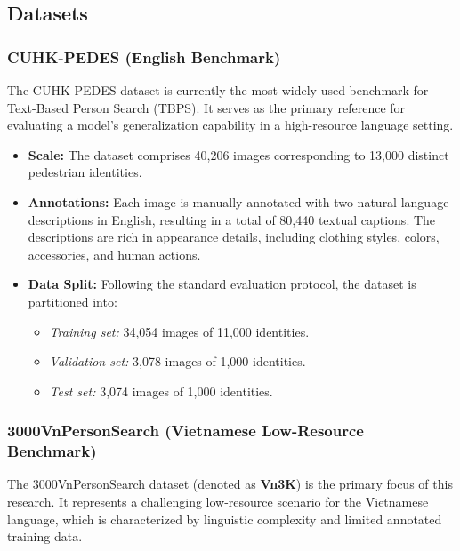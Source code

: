 \documentclass[../main.tex]{subfiles}
\begin{document}
\subsection{Datasets}

\subsubsection{CUHK-PEDES (English Benchmark)}

\noindent The CUHK-PEDES dataset is currently the most widely used benchmark for Text-Based Person Search (TBPS). It serves as the primary reference for evaluating a model's generalization capability in a high-resource language setting.

\begin{itemize}
    \item \textbf{Scale:} The dataset comprises 40,206 images corresponding to 13,000 distinct pedestrian identities.
    
    \item \textbf{Annotations:} Each image is manually annotated with two natural language descriptions in English, resulting in a total of 80,440 textual captions. The descriptions are rich in appearance details, including clothing styles, colors, accessories, and human actions.
    
    \item \textbf{Data Split:} Following the standard evaluation protocol, the dataset is partitioned into:
    \begin{itemize}
        \item \textit{Training set:} 34,054 images of 11,000 identities.
        \item \textit{Validation set:} 3,078 images of 1,000 identities.
        \item \textit{Test set:} 3,074 images of 1,000 identities.
    \end{itemize}
\end{itemize}

\subsubsection{3000VnPersonSearch (Vietnamese Low-Resource Benchmark)}

\noindent The 3000VnPersonSearch dataset (denoted as \textbf{Vn3K}) is the primary focus of this research. It represents a challenging low-resource scenario for the Vietnamese language, which is characterized by linguistic complexity and limited annotated training data.
\end{document}
